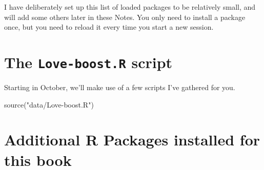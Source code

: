 \documentclass[
]{book}
\newenvironment{Shaded}{\begin{snugshade}}{\end{snugshade}}
\newcommand{\AttributeTok}[1]{\textcolor[rgb]{0.77,0.63,0.00}{#1}}
\newcommand{\CommentTok}[1]{\textcolor[rgb]{0.56,0.35,0.01}{\textit{#1}}}
\newcommand{\ConstantTok}[1]{\textcolor[rgb]{0.00,0.00,0.00}{#1}}
\newcommand{\FunctionTok}[1]{\textcolor[rgb]{0.00,0.00,0.00}{#1}}
\newcommand{\NormalTok}[1]{#1}
\newcommand{\SpecialCharTok}[1]{\textcolor[rgb]{0.00,0.00,0.00}{#1}}
\newcommand{\StringTok}[1]{\textcolor[rgb]{0.31,0.60,0.02}{#1}}
\begin{document}
\begin{Shaded}
\end{Shaded}

I have deliberately set up this list of loaded packages to be relatively small, and will add some others later in these Notes. You only need to install a package once, but you need to reload it every time you start a new session.

\hypertarget{the-love-boost.r-script}{%
\section*{\texorpdfstring{The \texttt{Love-boost.R} script}{The Love-boost.R script}}\label{the-love-boost.r-script}}

Starting in October, we'll make use of a few scripts I've gathered for you.

\begin{Shaded}
\begin{Highlighting}[]
\FunctionTok{source}\NormalTok{(}\StringTok{"data/Love{-}boost.R"}\NormalTok{)}
\end{Highlighting}
\end{Shaded}

\hypertarget{additional-r-packages-installed-for-this-book}{%
\section*{Additional R Packages installed for this book}\label{additional-r-packages-installed-for-this-book}}
\end{document}
